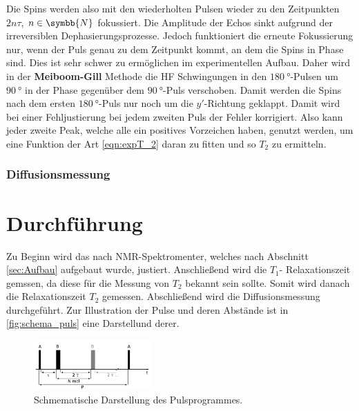         \noindent Die Spins werden also mit den wiederholten Pulsen wieder zu den Zeitpunkten $2 n \tau$, $n\in \symbb{N}$ fokussiert. Die Amplitude der Echos sinkt aufgrund der irreversiblen Dephasierungsprozesse. 
        Jedoch funktioniert die erneute Fokussierung nur, wenn der Puls genau zu dem Zeitpunkt kommt, an dem die Spins in Phase sind. Dies ist sehr schwer zu ermöglichen im experimentellen Aufbau. 
        Daher wird in der \textbf{Meiboom-Gill} Methode die HF Schwingungen in den $\SI{180}{\degree}$-Pulsen um $\SI{90}{\degree}$ in der Phase gegenüber dem $\SI{90}{\degree}$-Puls verschoben. 
        Damit werden die Spins nach dem ersten $\SI{180}{\degree}$-Puls nur noch um die $y'$-Richtung geklappt. Damit wird bei einer Fehljustierung bei jedem zweiten Puls der Fehler korrigiert. Also kann 
        jeder zweite Peak, welche alle ein positives Vorzeichen haben, genutzt werden, um eine Funktion der Art \eqref{eqn:expT_2} daran zu fitten und so $T_2$ zu ermitteln.
        
    \subsubsection{Diffusionsmessung}

        \noindent 

        
\section{Durchführung}
\label{sec:durchführung}

    \noindent Zu Beginn wird das nach NMR-Spektromenter, welches nach Abschnitt \ref{sec:Aufbau} aufgebaut wurde, justiert. Anschließend wird die $T_1$- Relaxationszeit gemssen, da diese für die Messung von $T_2$ bekannt 
    sein sollte. Somit wird danach die Relaxationszeit $T_2$ gemessen.  Abschließend wird die Diffusionsmessung durchgeführt. Zur Illustration der Pulse und deren Abstände ist in \autoref{fig:schema_puls} eine Darstellund 
    derer. 

    \begin{figure}
        \centering
        \includegraphics[width=0.4\textwidth]{images/schema_puls.png}
        \caption{Schmematische Darstellung des Pulsprogrammes. \cite{V49}}
        \label{fig:schema_puls}
    \end{figure}

